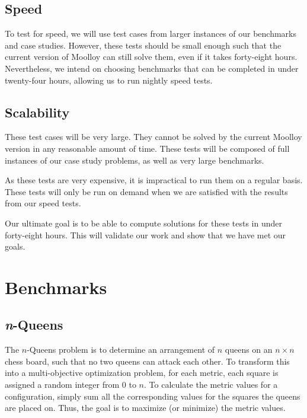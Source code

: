 \documentclass[11pt]{article}
\begin{document}
\subsection{Speed}

To test for speed, we will use test cases from larger instances of our
benchmarks and case studies. However, these tests should be small
enough such that the current version of Moolloy can still solve them,
even if it takes forty-eight hours. Nevertheless, we intend on choosing
benchmarks that can be completed in under twenty-four hours, allowing
us to run nightly speed tests.

\subsection{Scalability}

These test cases will be very large. They cannot be solved by the
current Moolloy version in any reasonable amount of time. These tests
will be composed of full instances of our case study problems, as well
as very large benchmarks.

As these tests are very expensive, it is impractical to run them on a
regular basis. These tests will only be run on demand when we are
satisfied with the results from our speed tests.

Our ultimate goal is to be able to compute solutions for these tests in
under forty-eight hours. This will validate our work and show that we
have met our goals.

\section{Benchmarks}

\subsection{\textit{n}-Queens}

The $n$-Queens problem is to determine an arrangement of $n$
queens on an $n \times n$ chess board, such that no two queens can
attack each other. To transform this into a multi-objective
optimization problem, for each metric, each square is assigned a random
integer from $0$ to $n$. To calculate the metric values for a
configuration, simply sum all the corresponding values for the squares
the queens are placed on. Thus, the goal is to maximize (or minimize)
the metric values.
\end{document}
